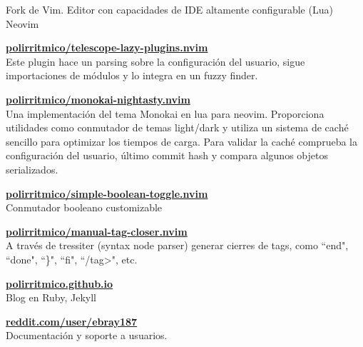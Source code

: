 \begin{cventries}
  \cventry
    {Fork de Vim. Editor con capacidades de IDE altamente configurable (Lua)} %
    {Neovim} %
    {} %
    {} %
    {
    \begin{cvitems} %
      \item {\textbf{\href{https://github.com/polirritmico/telescope-lazy-plugins.nvim}{polirritmico/telescope-lazy-plugins.nvim}}\\ Este plugin hace un parsing sobre la configuración del usuario, sigue importaciones de módulos y lo integra en un fuzzy finder.}
      \item {\textbf{\href{https://github.com/polirritmico/monokai-nightasty.nvim}{polirritmico/monokai-nightasty.nvim}}\\ Una implementación del tema Monokai en lua para neovim. Proporciona utilidades como conmutador de temas light/dark y utiliza un sistema de caché sencillo para optimizar los tiempos de carga. Para validar la caché comprueba la configuración del usuario, último commit hash y compara algunos objetos serializados.}
      \item {\textbf{\href{https://github.com/polirritmico/simple-boolean-toggle.nvim}{polirritmico/simple-boolean-toggle.nvim}}\\ Conmutador booleano customizable}
      \item
          {\textbf{\href{https://github.com/polirritmico/manual-tag-closer.nvim}{polirritmico/manual-tag-closer.nvim}}\\
            A través de tressiter (syntax node parser) generar cierres de tags,
            como ``end", ``done", ``\}", ``fi", ``\</tag>", etc.}
      \item {\textbf{\href{https://polirritmico.github.io/}{polirritmico.github.io}}\\ Blog en Ruby, Jekyll}
      \item {\textbf{\href{https://www.reddit.com/user/ebray187/}{reddit.com/user/ebray187}}\\ Documentación y soporte a usuarios.}
    \end{cvitems}
    }

\end{cventries}

